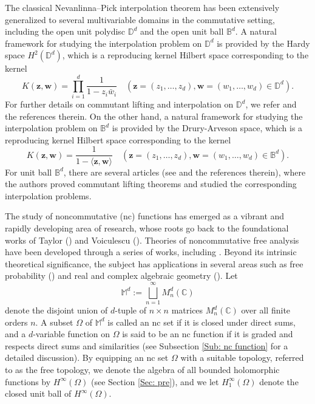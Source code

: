 \documentclass[12pt]{amsart}%
\numberwithin{equation}{section}
\newcommand{\bB}{\mathbb{B}}
\newcommand{\bM}{\mathbb{M}}
\newcommand{\D}{\mathbb{D}}
\newcommand{\C}{\mathbb{C}}
\newcommand{\z}{\bm{z}}
\newcommand{\w}{\bm{w}}
\begin{document}
The classical Nevanlinna–Pick interpolation theorem has been extensively generalized
to several multivariable domains in the commutative setting, including the open unit polydisc $\mathbb{D}^{d}$ and the open unit ball $\mathbb{B}^{d}$. A natural framework for studying the interpolation problem on $\D^d$ is provided by the Hardy space $H^2(\D^d)$, which is a reproducing kernel Hilbert space corresponding to the kernel 
\[
K(\z,\w)=\prod_{i=1}^d\frac{1}{1-z_i\bar w_i}\quad(\z=(z_1,\ldots,z_d),\w=(w_1,\ldots,w_d)\in \D^d).
\]
For further details on commutant lifting and interpolation on $\D^d$, we refer \cite{BLTT, BBD, BDS, DasPanja, DS} and the references therein. 
On the other hand, a natural framework for studying the interpolation problem on $\bB^d$ is provided by the Drury-Arveson space, which is a reproducing kernel Hilbert space corresponding to the kernel
\[
K(\z,\w)=\frac{1}{1-\langle\z,\w\rangle}\quad(\z=(z_1,\ldots,z_d),\w=(w_1,\ldots,w_d)\in \bB^d).
\]
For unit ball $\bB^d$, there are several articles (see \cite{AT, BTV, DL, EP} and the references therein), where the authors proved commutant lifting theorems and studied the corresponding interpolation problems.


The study of noncommutative (nc) functions has emerged as a vibrant and rapidly developing area of research, whose roots go back to the foundational works
of Taylor (\cite{T72,T73}) and Voiculescu (\cite{V85,V86,V04,V10}). Theories of noncommutative free analysis have been developed through a series of works, including \cite{AMC15,AME15,AM16,KV, P06}. Beyond its intrinsic theoretical significance, the subject has applications in several areas such as free probability (\cite{PV}) and real and complex algebraic geometry (\cite{H,HM}). Let $$\bM^{d}:=\bigsqcup_{n=1}^{\infty}M_n^d(\C)$$ denote the disjoint union of $d$-tuple of $n\times n$ matrices $M_n^d(\C)$ over all finite orders $n$. A subset $\Omega$ of $\bM^d$ is called an nc set if it is closed under direct sums, and a $d$-variable function on $\Omega$ is said to be an nc function if it is graded and respects direct sums and similarities (see Subsection \ref{Sub: nc function} for a detailed discussion). By equipping an nc set $\Omega$ with a suitable topology, referred to as the free topology, we denote the algebra of all bounded holomorphic functions by $H^{\infty}(\Omega)$ (see Section \ref{Sec: pre}), and we let $H_1^{\infty}(\Omega)$ denote the closed unit ball of $H^{\infty}(\Omega)$. 
\end{document}
